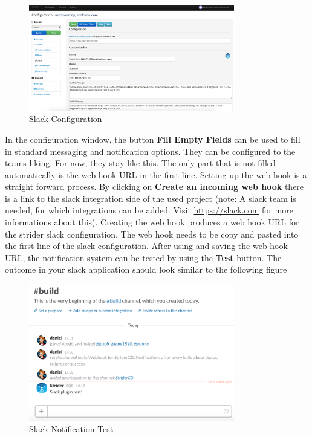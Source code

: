 \begin{figure}[h!]
  \centering
  \includegraphics[width=0.8\textwidth]{images/slack_config.png}
  \caption{Slack Configuration}
\end{figure}

In the configuration window, the button \textbf{Fill Empty Fields} can be used to fill in standard messaging and notification options. They can be
configured to the teams liking. For now, they stay like this. The only part that is not filled automatically is the web hook URL in the first line.
Setting up the web hook is a straight forward process. By clicking on \textbf{Create an incoming web hook} there is a link to the slack integration
side of the used project (note: A slack team is needed, for which integrations can be added. Visit \url{https://slack.com} for more informations about
this). Creating the web hook produces a web hook URL for the strider slack configuration. The web hook needs to be copy and pasted into the first line
of the slack configuration. After using and saving the web hook URL, the notification system can be tested by using the \textbf{Test} button.
The outcome in your slack application should look similar to the following figure

\begin{figure}[h!]
  \centering
  \includegraphics[width=0.8\textwidth]{images/slack_test.png}
  \caption{Slack Notification Test}
\end{figure}

